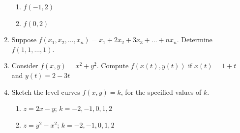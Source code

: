\documentclass[12pt]{article}
\newif\ifans
\begin{document}
\begin{enumerate}
\begin{enumerate}
\item $f(-1,2)$

\ifans{\fbox{0}} \fi

\item $f(0,2)$

\ifans{\fbox{$\frac{2}{3}$}} \fi

\end{enumerate}

\item Suppose $f(x_1,x_2,\dots,x_n)=x_1+2x_2+3x_3+\dots+nx_n$.  Determine $f(1,1,\dots,1)$.

\ifans{\fbox{$\frac{n(n+1)}{2}$}} \fi

\item Consider $f(x,y)=x^2+y^2$.  Compute $f(x(t),y(t))$ if $x(t)=1+t$ and $y(t)=2-3t$

\ifans{\fbox{$10t^2-10t+5$}} \fi

\newpage

\item Sketch the level curves $f(x,y)=k$, for the specified values of $k$.

\begin{enumerate}

\item $z=2x-y$; $k=-2,-1, 0, 1, 2$ 

\item $z=y^2-x^2$; $k=-2,-1, 0, 1, 2$

\end{enumerate}


\end{enumerate}
\end{document}
